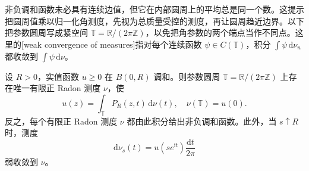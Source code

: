 \ProseParagraphBreak
非负调和函数未必具有连续边值，但它在内部圆周上的平均总是同一个数。这提示把圆周值乘以归一化角测度，先视为总质量受控的测度，再让圆周趋近边界。以下把参数圆周写成紧空间 \(\mathbb T=\mathbb R/(2\pi\mathbb Z)\)，以免把角参数的两个端点当作不同点。这里的[weak convergence of measures]指对每个连续函数 \(\psi\in C(\mathbb T)\)，积分 \(\int\psi\,\mathrm d\nu_n\) 都收敛到 \(\int\psi\,\mathrm d\nu\)。

\begin{theorem}[正调和函数的边界测度表示]\label{b3:thm:15-positive-boundary-measure}
设 \(R>0\)，实值函数 \(u\ge0\) 在 \(B(0,R)\) 调和。则参数圆周 \(\mathbb T=\mathbb R/(2\pi\mathbb Z)\) 上存在唯一有限正 Radon 测度 \(\nu\)，使
\[
 u(z)=\int_{\mathbb T}P_R(z,t)\,\mathrm d\nu(t),
 \quad \nu(\mathbb T)=u(0).
\]
反之，每个有限正 Radon 测度 \(\nu\) 都由此积分给出非负调和函数。此外，当 \(s\uparrow R\) 时，测度
\[
 \mathrm d\nu_s(t)=u(se^{\mathrm i t})\frac{\mathrm dt}{2\pi}
\]
弱收敛到 \(\nu\)。
\end{theorem}
